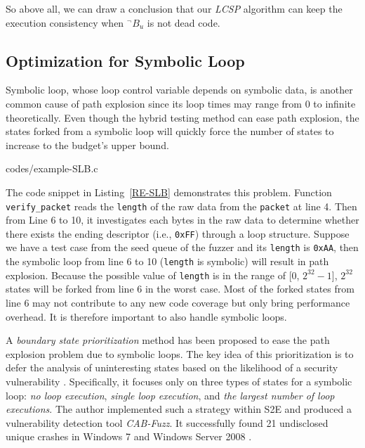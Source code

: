 So above all, we can draw a conclusion that our \emph{LCSP} algorithm 
can keep the execution consistency when $^\neg B_u$ is not dead code.

\subsection{Optimization for Symbolic Loop}
Symbolic loop, whose loop control variable depends on symbolic data, 
is another common cause of path explosion since its loop times may 
range from 0 to infinite theoretically. 
Even though the hybrid testing method can ease path explosion, the 
states forked from a symbolic loop will quickly force the number of 
states to increase to the budget's upper bound. 


{codes/example-SLB.c} 

The code snippet in Listing~\ref{RE-SLB} demonstrates this problem. 
Function \texttt{verify\_packet} reads the \texttt{length} of the 
raw data from the \texttt{packet} at line 4.
 Then from Line 6 to 10, it investigates each bytes in the raw data 
 to determine whether there exists the ending descriptor 
 (i.e., \texttt{0xFF}) through a loop structure. 
 Suppose we have a test case from the seed queue of 
 the fuzzer and its \texttt{length} is \texttt{0xAA}, 
 then the symbolic loop 
 from line 6 to 10 (\texttt{length} is symbolic) 
 will result in path explosion.
 Because the possible value of \texttt{length} is in the 
 range of [0, $2^{32}-1$], $2^{32}$ states will be forked from 
 line 6 in the worst case. 
Most of the forked states from line 6 may not contribute 
to any new code coverage but only bring performance overhead.
It is therefore important to also handle symbolic loops. 

A \textit{boundary state prioritization} method has been proposed 
to ease the path explosion problem due to symbolic loops.
The key idea of this prioritization is to defer the analysis of 
uninteresting states based on the likelihood of a security vulnerability \cite{cab-fuzz}. 
Specifically, it focuses only on three types of states for a symbolic 
loop: \textit{no loop execution}, \textit{single loop execution}, and 
\textit{the largest number of loop executions}.
The author implemented such a strategy within S2E \cite{chipounov2011s2e} 
and produced a vulnerability detection tool \textit{CAB-Fuzz}.
It successfully found 21 undisclosed unique crashes in Windows 7 and 
Windows Server 2008 \cite{cab-fuzz}.
 
